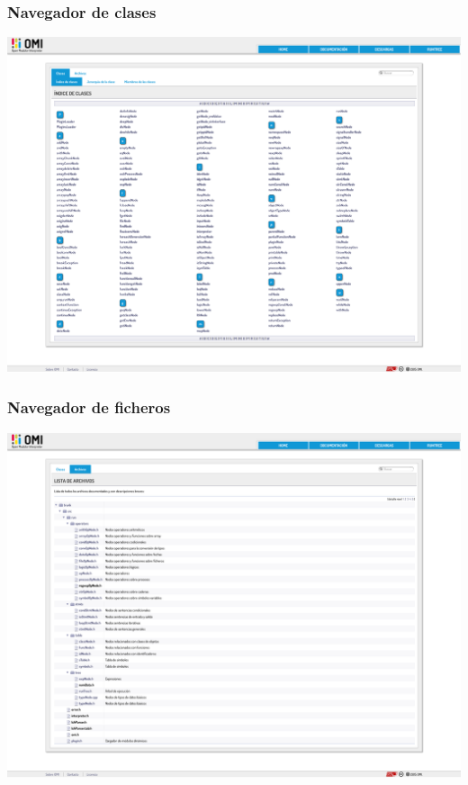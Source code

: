 \subsubsection{Navegador de clases}
\begin{center}
\includegraphics[scale=0.2]{class.png} \\
\end{center}

\subsubsection{Navegador de ficheros}
\begin{center}
\includegraphics[scale=0.2]{files.png} \\
\end{center}

